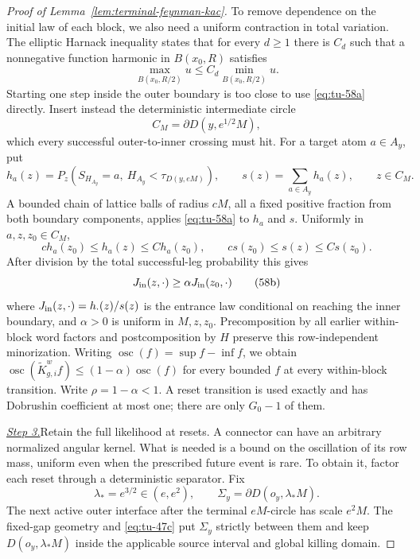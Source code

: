 \begin{proof}[Proof of Lemma~\ref{lem:terminal-feynman-kac}]
To remove dependence on the initial law of each block, we also need a
uniform contraction in total variation. The elliptic Harnack inequality
\cite[Theorem~1.1]{AthreyaEtAl2022} states that for every \(d\ge1\)
there is \(C_d\) such that a nonnegative function harmonic in
\(B(x_0,R)\) satisfies
\begin{equation}
       \max_{B(x_0,R/2)}u\le C_d\min_{B(x_0,R/2)}u.           \tag{58a}\label{eq:tu-58a}
\end{equation}
Starting one step inside the outer boundary is too close to use \eqref{eq:tu-58a}
directly.  Insert instead the deterministic intermediate circle
\[
                 C_M=\partial D(y,e^{1/2}M),
\]
which every successful outer-to-inner crossing must hit.  For a target
atom \(a\in A_y\), put
\[
 h_a(z)=P_z(S_{H_{A_y}}=a,\ H_{A_y}<\tau_{D(y,eM)}),
 \qquad s(z)=\sum_{a\in A_y}h_a(z),\qquad z\in C_M.
\]
A bounded chain of lattice balls of radius \(cM\), all a fixed positive
fraction from both boundary components, applies \eqref{eq:tu-58a} to \(h_a\) and
\(s\).  Uniformly in \(a,z,z_0\in C_M\),
\[
 ch_a(z_0)\le h_a(z)\le Ch_a(z_0),\qquad
 cs(z_0)\le s(z)\le Cs(z_0).
\]
After division by the total successful-leg probability this gives
\begin{equation}
       J_{\rm in}(z,\cdot)\ge\alpha
                     J_{\rm in}(z_0,\cdot)                  \tag{58b}\label{eq:tu-58b}
\end{equation}
where \(J_{\rm in}(z,\cdot)=h_{\cdot}(z)/s(z)\) is the entrance
law conditional on reaching the inner boundary, and \(\alpha>0\) is
uniform in \(M,z,z_0\). Precomposition by all earlier
within-block word factors and postcomposition by \(H\) preserve this row-independent
minorization. Writing \(\operatorname{osc}(f)=\sup f-\inf f\), we obtain
\(\operatorname {osc}(\widetilde K_{g,i}^wf)\le(1-\alpha)
\operatorname {osc}(f)\) for every bounded \(f\) at every within-block
transition.  Write \(\rho=1-\alpha<1\).  A reset transition is used
exactly and has Dobrushin coefficient at most one; there are only
\(G_0-1\) of them.

\smallskip\noindent
\underline{\textit{Step 3.}}\quad Retain the full likelihood at resets.
A connector can have an arbitrary normalized angular kernel. What is
needed is a bound on the oscillation of its row mass, uniform even when
the prescribed future event is rare. To obtain it, factor each reset
through a deterministic separator. Fix
\begin{equation}
        \lambda_*=e^{3/2}\in(e,e^2),\qquad
        \Sigma_y=\partial D(o_y,\lambda_*M).                \tag{59a0}\label{eq:tu-59a0}
\end{equation}
The next active outer interface after the terminal \(eM\)-circle has scale
\(e^2M\).  The fixed-gap geometry and \eqref{eq:tu-47c} put \(\Sigma_y\) strictly
between them and keep \(D(o_y,\lambda_*M)\) inside the applicable source
interval and global killing domain.


\end{proof}

